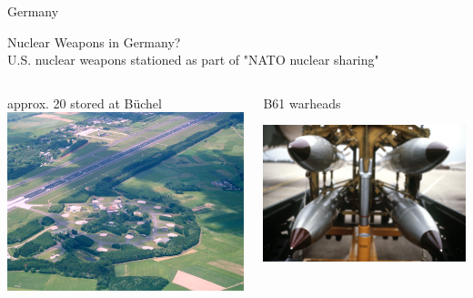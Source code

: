 \documentclass[presentation]{beamer}
\begin{document}
\begin{frame}[label=sec-1-9]{Germany}
\vspace{-0.5cm}
\begin{center}
Nuclear Weapons in Germany?\\[0.7em]
\pause
U.S. nuclear weapons stationed as part of "NATO nuclear sharing"
\end{center}

\vspace{-0.3cm}
\begin{columns}[t]
\begin{column}{0.48\textwidth}
\begin{block}{approx. 20 stored at Büchel}
\includegraphics[width=\textwidth]{images/Buechel_Fliegerhorst.jpg}
\end{block}
\end{column}

\begin{column}{0.48\textwidth}
\begin{block}{B61 warheads}

\vspace{0.2cm}

\includegraphics[width=\textwidth]{images/B-61_bomb_rack.jpg}
\end{block}
\end{column}
\end{columns}


\end{frame}
\end{document}
